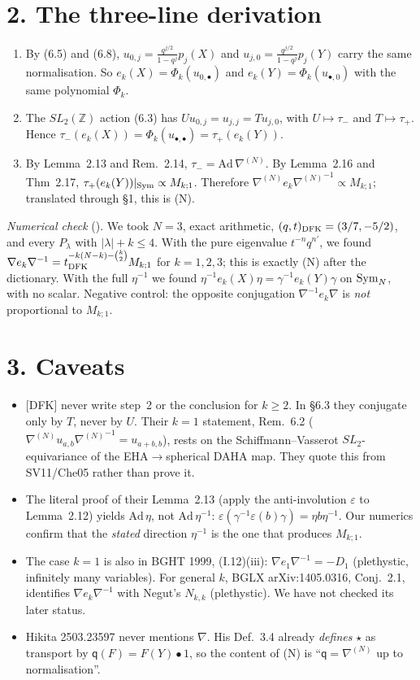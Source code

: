 \documentclass[10pt]{article}
\newcommand{\file}[1]{{\footnotesize\texttt{\detokenize{#1}}}}
\newcommand{\nablaN}{{\nabla^{(N)}}}
\begin{document}
\section*{2. The three-line derivation}
\begin{enumerate}
\item By (6.5) and (6.8), $u_{0,j}=\frac{q^{j/2}}{1-q^j}p_j(X)$ and $u_{j,0}=\frac{q^{j/2}}{1-q^j}p_j(Y)$ carry the same normalisation.
So $e_k(X)=\Phi_k(u_{0,\bullet})$ and $e_k(Y)=\Phi_k(u_{\bullet,0})$ with the same polynomial $\Phi_k$.
\item The $SL_2(\mathbb Z)$ action (6.3) has $U u_{0,j}=u_{j,j}=T u_{j,0}$, with $U\mapsto\tau_-$ and $T\mapsto\tau_+$.
Hence $\tau_-(e_k(X))=\Phi_k(u_{\bullet,\bullet})=\tau_+(e_k(Y))$.
\item By Lemma~2.13 and Rem.~2.14, $\tau_-=\mathrm{Ad}\,\nablaN$.
By Lemma~2.16 and Thm~2.17, $\tau_+(e_k(Y))|_{\rm Sym}\propto M_{k;1}$.
Therefore $\nablaN e_k\nablaN^{-1}\propto M_{k;1}$; translated through \S1, this is (N).
\end{enumerate}
\emph{Numerical check} (\file{scripts/day217dfk/dfk_check.py}).
We took $N=3$, exact arithmetic, $(q,t)_{\rm DFK}=(3/7,-5/2)$, and every $P_\lambda$ with $|\lambda|+k\le4$.
With the pure eigenvalue $t^{-n}q^{n'}$, we found $\nabla e_k\nabla^{-1}=t_{\rm DFK}^{-k(N-k)-\binom k2}M_{k;1}$ for $k=1,2,3$; this is exactly (N) after the dictionary.
With the full $\eta^{-1}$ we found $\eta^{-1}e_k(X)\eta=\gamma^{-1}e_k(Y)\gamma$ on ${\rm Sym}_N$, with no scalar.
Negative control: the opposite conjugation $\nabla^{-1}e_k\nabla$ is \emph{not} proportional to $M_{k;1}$.

\section*{3. Caveats}
\begin{itemize}
\item {[DFK]} never write step~2 or the conclusion for $k\ge2$. In \S6.3 they conjugate only by $T$, never by $U$.
Their $k=1$ statement, Rem.~6.2 ($\nablaN u_{a,b}\nablaN^{-1}=u_{a+b,b}$), rests on the Schiffmann--Vasserot $SL_2$-equivariance of the EHA$\to$spherical DAHA map. They quote this from SV11/Che05 rather than prove it.
\item The literal proof of their Lemma~2.13 (apply the anti-involution $\varepsilon$ to Lemma~2.12) yields $\mathrm{Ad}\,\eta$, not $\mathrm{Ad}\,\eta^{-1}$: $\varepsilon(\gamma^{-1}\varepsilon(b)\gamma)=\eta b\eta^{-1}$. Our numerics confirm that the \emph{stated} direction $\eta^{-1}$ is the one that produces $M_{k;1}$.
\item The case $k=1$ is also in BGHT 1999, (I.12)(iii): $\nabla e_1\nabla^{-1}=-D_1$ (plethystic, infinitely many variables).
For general $k$, BGLX arXiv:1405.0316, Conj.~2.1, identifies $\nabla e_k\nabla^{-1}$ with Negut's $N_{k,k}$ (plethystic). We have not checked its later status.
\item Hikita 2503.23597 never mentions $\nabla$. His Def.~3.4 already \emph{defines} $\star$ as transport by $\mathsf q(F)=F(Y)\bullet1$, so the content of (N) is ``$\mathsf q=\nablaN$ up to normalisation''.
\end{itemize}
\end{document}

